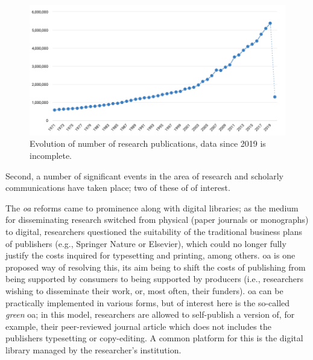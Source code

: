 \begin{figure}[ht!]
\centering
  \includegraphics[width=1\linewidth]{publications.png}  
  \caption{Evolution of number of research publications, data since 2019 is incomplete.}
  \label{fig:nopublications}
\end{figure}

Second, a number of significant events in the area of research and scholarly communications have taken place; two of these of of interest.

The \emph{\gls{oa}} reforms came to prominence along with digital libraries; as the medium for disseminating research switched from physical (paper journals or monographs) to digital, researchers questioned the suitability of the traditional business plans of publishers (e.g., Springer Nature or Elsevier), which could no longer fully justify the costs inquired for typesetting and printing, among others. \gls{oa} is one proposed way of resolving this, its aim being to shift the costs of publishing from being supported by consumers to being supported by producers (i.e., researchers wishing to disseminate their work, or, most often, their funders). \gls{oa} can be practically implemented in various forms, but of interest here is the so-called \emph{green} \gls{oa}; in this model, researchers are allowed to self-publish a version of, for example, their peer-reviewed journal article which does not includes the publishers typesetting or copy-editing. A common platform for this is the digital library managed by the researcher's institution.

